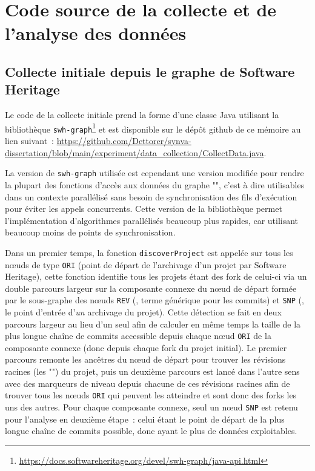 
\chapter{Code source de la collecte et de l'analyse des données}

\section{Collecte initiale depuis le graphe de Software Heritage}
\label{app:collect.java}

Le code de la collecte initiale prend la forme d'une classe Java utilisant la bibliothèque
\texttt{swh-graph}\footnote{\url{https://docs.softwareheritage.org/devel/swh-graph/java-api.html}} et est
disponible sur le dépôt \gls{github} de ce mémoire au lien suivant :
\url{https://github.com/Dettorer/synva-dissertation/blob/main/experiment/data_collection/CollectData.java}.

La version de \texttt{swh-graph} utilisée est cependant une version modifiée pour rendre la plupart des
fonctions d'accès aux données du graphe "", c'est à dire utilisables dans un contexte
parallélisé sans besoin de synchronisation des fils d'exécution pour éviter les appels concurrents. Cette
version de la bibliothèque permet l'implémentation d'algorithmes parallélisés beaucoup plus rapides, car
utilisant beaucoup moins de points de synchronisation.

Dans un premier temps, la fonction \texttt{discoverProject} est appelée sur tous les nœuds de type
\texttt{ORI} (point de départ de l'archivage d'un projet par Software Heritage), cette fonction identifie tous
les projets étant des \gls{fork} de celui-ci via un double parcours largeur sur la composante connexe du nœud
de départ formée par le sous-graphe des nœuds \texttt{REV} (, terme générique pour les
\glspl{commit}) et \texttt{SNP} (, le point d'entrée d'\emph{un} archivage du projet). Cette
détection se fait en deux parcours largeur au lieu d'un seul afin de calculer en même temps la taille de la
plus longue chaîne de commits accessible depuis chaque nœud \texttt{ORI} de la composante connexe (donc depuis
chaque \gls{fork} du projet initial). Le premier parcours remonte les ancêtres du nœud de départ pour trouver
les révisions racines (les "") du projet, puis un deuxième parcours est lancé dans
l'autre sens avec des marqueurs de niveau depuis chacune de ces révisions racines afin de trouver tous les
nœuds \texttt{ORI} qui peuvent les atteindre et sont donc des \glspl{fork} les uns des autres. Pour chaque
composante connexe, seul un nœud \texttt{SNP} est retenu pour l'analyse en deuxième étape : celui étant le
point de départ de la plus longue chaîne de \glspl{commit} possible, donc ayant le plus de données
exploitables.

